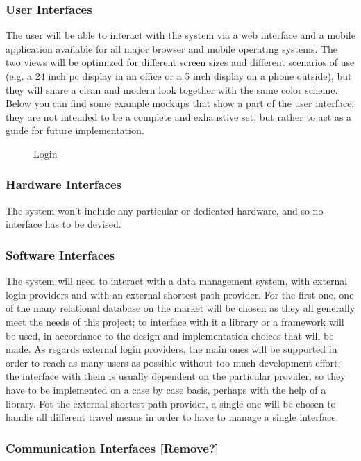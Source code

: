 \subsubsection{User Interfaces}

The user will be able to interact with the system via a web interface and a mobile application available for all major browser and mobile operating systems. The two views will be optimized for different screen sizes and different scenarios of use (e.g. a 24 inch pc display in an office or a 5 inch display on a phone outside), but they will share a clean and modern look together with the same color scheme.
\\ [0.2 cm]
Below you can find some example mockups that show a part of the user interface; they are not intended to be a complete and exhaustive set, but rather to act as a guide for future implementation.
\\ [0.5 cm]

\begin{figure}[!h]
\caption{Login}
\end{figure}

\subsubsection{Hardware Interfaces}

The system won't include any particular or dedicated hardware, and so no interface has to be devised.

\subsubsection{Software Interfaces}

The system will need to interact with a data management system, with external login providers and with an external shortest path provider.
For the first one, one of the many relational database on the market will be chosen as they all generally meet the needs of this project; to interface with it a library or a framework will be used, in accordance to the design and implementation choices that will be made.
As regards external login providers, the main ones will be supported in order to reach as many users as possible without too much development effort; the interface with them is usually dependent on the particular provider, so they have to be implemented on a case by case basis, perhaps with the help of a library.
Fot the external shortest path provider, a single one will be chosen to handle all different travel means in order to have to manage a single interface.

\subsubsection{Communication Interfaces [Remove?]}